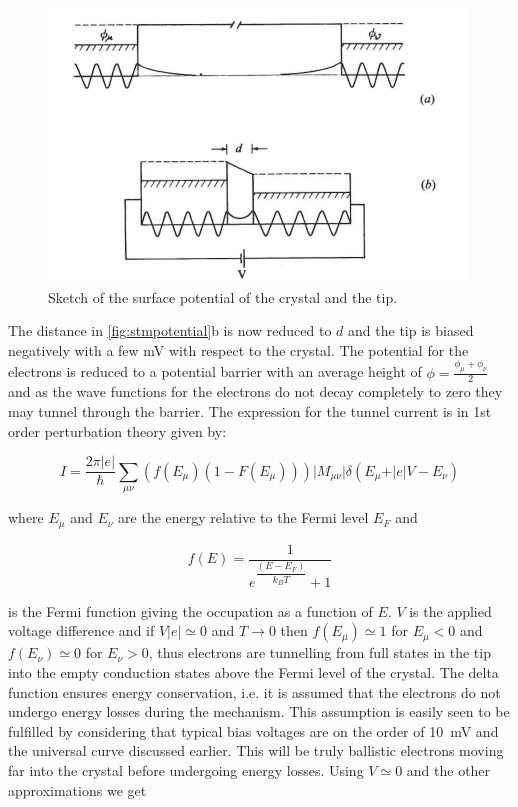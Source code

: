 \begin{figure}[h!]
	\begin{center}
	\includegraphics[scale=4]{figures/10_02.png}
	\caption{Sketch of the surface potential of the crystal and the tip.}
	\label{fig:stmpotential}
	\end{center}
\end{figure}

The  distance in \autoref{fig:stmpotential}b is now reduced to $d$ and the tip is biased negatively with a few \si{mV} with respect to the crystal. The potential for the electrons is reduced to a potential barrier with an average height of $\phi=\frac{\phi_{\mu}+\phi_{\nu}}{2}$ and as the wave functions for the electrons do not decay completely to zero they  may tunnel through the barrier. The expression for the tunnel current is in 1st order perturbation theory given by:

\begin{equation}
I=\frac{2\pi\vert e\vert}{\hbar}\sum_{\mu \nu}(f(E_{\mu})(1-F(E_{\mu})))\vert M_{\mu\nu}\vert\delta(E_{\mu}+\vert e\vert V-E_{\nu})
\end{equation}

\noindent where $E_{\mu}$ and $E_{\nu}$ are the energy relative to the Fermi level $E_F$ and

\begin{equation}
f(E)=\frac{1}{e^{\dfrac{(E-E_F)}{k_BT}}+1}
\end{equation}

\noindent is the Fermi function giving the occupation as a function of $E$. $V$ is the applied voltage difference and if $V\vert e\vert\simeq 0$ and $T \rightarrow 0$ then $f(E_{\mu}) \simeq 1$ for $E_{\mu}<0$ and $f(E_{\nu})\simeq 0$ for $E_{\nu}>0$, thus electrons are tunnelling from full states in the tip into the empty conduction states above the Fermi level of the crystal. The delta function ensures energy conservation, i.e. it is assumed that the electrons do not undergo energy losses during the mechanism. This assumption is easily seen to be fulfilled  by considering that typical bias voltages are on the order of \SI{10}{mV} and the universal curve discussed earlier. This will be truly ballistic electrons moving far into the crystal before undergoing energy losses. Using  $V\simeq 0$ and the other  approximations we get 

